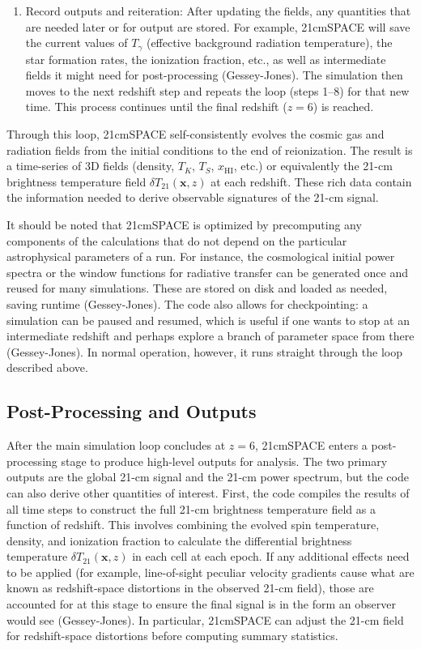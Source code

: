\documentclass[floats,floatfix,showpacs,amssymb,prd,superscriptaddress,nofootinbib]{revtex4-2} %
\begin{document}
\begin{enumerate}
    \item Record outputs and reiteration: After updating the fields, any quantities that are needed later or for output are stored. For example, 21cmSPACE will save the current values of $T_\gamma$ (effective background radiation temperature), the star formation rates, the ionization fraction, etc., as well as intermediate fields it might need for post-processing (Gessey-Jones). The simulation then moves to the next redshift step and repeats the loop (steps 1–8) for that new time. This process continues until the final redshift ($z=6$) is reached.
\end{enumerate}

Through this loop, 21cmSPACE self-consistently evolves the cosmic gas and radiation fields from the initial conditions to the end of reionization. The result is a time-series of 3D fields (density, $T_K$, $T_S$, $x_{\mathrm{HI}}$, etc.) or equivalently the 21-cm brightness temperature field $\delta T_{21}(\mathbf{x}, z)$ at each redshift. These rich data contain the information needed to derive observable signatures of the 21-cm signal.

It should be noted that 21cmSPACE is optimized by precomputing any components of the calculations that do not depend on the particular astrophysical parameters of a run. For instance, the cosmological initial power spectra or the window functions for radiative transfer can be generated once and reused for many simulations. These are stored on disk and loaded as needed, saving runtime (Gessey-Jones). The code also allows for checkpointing: a simulation can be paused and resumed, which is useful if one wants to stop at an intermediate redshift and perhaps explore a branch of parameter space from there (Gessey-Jones). In normal operation, however, it runs straight through the loop described above.

\subsection{Post-Processing and Outputs}

After the main simulation loop concludes at $z=6$, 21cmSPACE enters a post-processing stage to produce high-level outputs for analysis. The two primary outputs are the global 21-cm signal and the 21-cm power spectrum, but the code can also derive other quantities of interest. First, the code compiles the results of all time steps to construct the full 21-cm brightness temperature field as a function of redshift. This involves combining the evolved spin temperature, density, and ionization fraction to calculate the differential brightness temperature $\delta T_{21}(\mathbf{x}, z)$ in each cell at each epoch. If any additional effects need to be applied (for example, line-of-sight peculiar velocity gradients cause what are known as redshift-space distortions in the observed 21-cm field), those are accounted for at this stage to ensure the final signal is in the form an observer would see (Gessey-Jones). In particular, 21cmSPACE can adjust the 21-cm field for redshift-space distortions before computing summary statistics. 
\end{document}
